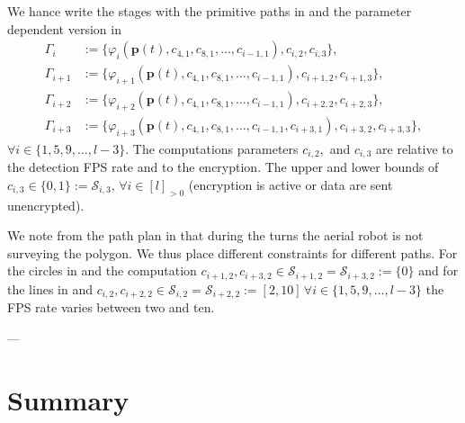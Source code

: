 We hance write the stages with the primitive paths in  and the parameter dependent version in 
\begin{subequations}\begin{align}
  \Gamma_i&:=\{\varphi_i(\mathbf{p}(t),c_{4,1},c_{8,1},\dots,c_{i-1,1}),c_{i,2},c_{i,3}\},\label{eq:line-plan}\\
  \Gamma_{i+1}&:=\{\varphi_{i+1}(\mathbf{p}(t),c_{4,1},c_{8,1},\dots,c_{i-1,1}),c_{i+1,2},c_{i+1,3}\},\label{eq:circ-plan}\\
  \Gamma_{i+2}&:=\{\varphi_{i+2}(\mathbf{p}(t),c_{4,1},c_{8,1},\dots,c_{i-1,1}),c_{i+2,2},c_{i+2,3}\},\label{eq:line2-plan}\\
  \Gamma_{i+3}&:=\{\varphi_{i+3}(\mathbf{p}(t),c_{4,1},c_{8,1},\dots,c_{i-1,1},c_{i+3,1}),c_{i+3,2},c_{i+3,3}\},\label{eq:circ2-plan}
\end{align}
\end{subequations}
$\forall i\in\{1,5,9,\dots,l-3\}$. The computations parameters $c_{i,2},$ and $c_{i,3}$ are relative to the detection FPS rate and to the encryption. The upper and lower bounds of $c_{i,3}\in\{0,1\}:=\mathcal{S}_{i,3},\,\forall i\in[l]_{>0}$ (encryption is active or data are sent unencrypted).

We note from the path plan in  that during the turns the aerial robot is not surveying the polygon. We thus place different constraints for different paths. For the circles in  and  the computation $c_{i+1,2},c_{i+3,2}\in\mathcal{S}_{i+1,2}=\mathcal{S}_{i+3,2}:=\{0\}$ and for the lines in  and  $c_{i,2},c_{i+2,2}\in\mathcal{S}_{i,2}=\mathcal{S}_{i+2,2}:=[2,10]\,\forall i\in\{1,5,9,\dots,l-3\}$ the FPS rate varies between two and ten.

---

\section{\color{red}Summary}

